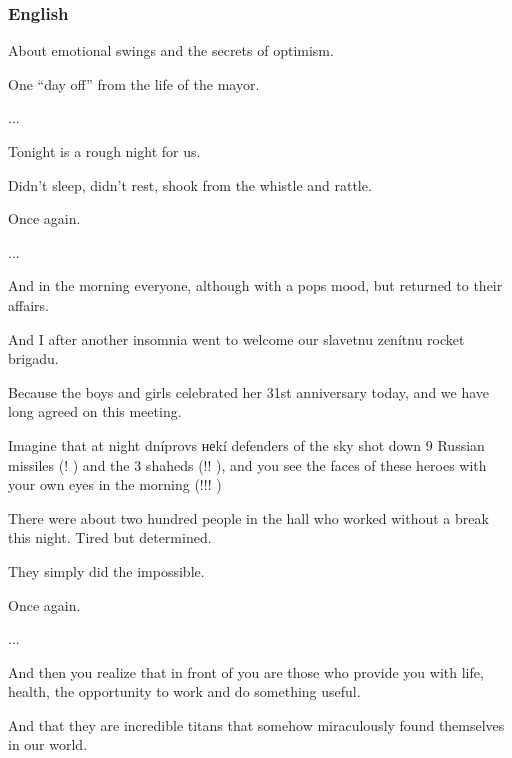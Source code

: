  
 
 
 
 

\subsubsection{English}

About emotional swings and the secrets of optimism.\par
One \enquote{day off} from the life of the mayor.\par
...\par
Tonight is a rough night for us.\par
Didn't sleep, didn't rest, shook from the whistle and rattle.\par
Once again.\par
...\par
And in the morning everyone, although with a pops mood, but returned to their affairs.\par
And I after another insomnia went to welcome our slavetnu zenítnu rocket brigadu.\par
Because the boys and girls celebrated her 31st anniversary today, and we have long agreed on this meeting.\par
Imagine that at night dníprovs неkí defenders of the sky shot down 9 Russian missiles (! ) and the 3 shaheds (!! ), and you see the faces of these heroes with your own eyes in the morning (!!! )\par
There were about two hundred people in the hall who worked without a break this night. Tired but determined.\par
They simply did the impossible.\par
Once again.\par
...\par
And then you realize that in front of you are those who provide you with life, health, the opportunity to work and do something useful.\par
And that they are incredible titans that somehow miraculously found themselves in our world.\par
